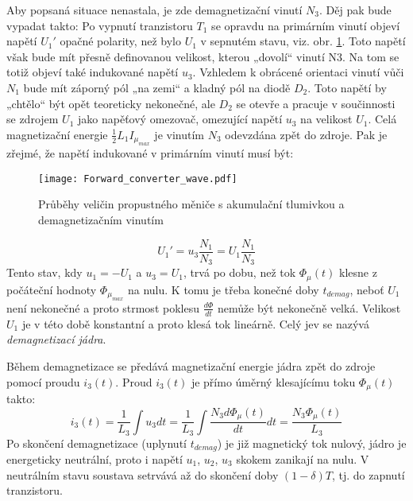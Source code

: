       Aby popsaná situace nenastala, je zde demagnetizační vinutí $N_3$. Děj pak bude vypadat takto: 
      Po vypnutí tranzistoru $T_1$ se opravdu na primárním vinutí objeví napětí $U_1'$ opačné 
      polarity, než bylo $U_1$ v sepnutém stavu, viz. obr. \ref{enz:fig_Forward_demag_wave}. Toto 
      napětí však bude mít přesně definovanou velikost, kterou „dovolí“ vinutí N3. Na tom se totiž 
      objeví také indukované napětí $u_3$. Vzhledem k obrácené orientaci vinutí vůči $N_1$ bude mít 
      záporný pól „na zemi“ a kladný pól na diodě $D_2$. Toto napětí by „chtělo“ být opět teoreticky 
      nekonečné, ale $D_2$ se otevře a pracuje v součinnosti se zdrojem  $U_1$ jako napěťový 
      omezovač, omezující napětí $u_3$ na velikost $U_1$. Celá magnetizační energie 
      $\frac{1}{2}L_1I_{\mu_{max}}$ je vinutím  $N_3$ odevzdána zpět do zdroje. Pak je zřejmé, že 
      napětí indukované v primárním vinutí musí být:
      
      \begin{figure}
        \captionsetup{type=figure}
        \texttt{[image: Forward\_converter\_wave.pdf]}
        \caption{Průběhy veličin propustného měniče s akumulační tlumivkou a demagnetizačním vinutím}
        \label{enz:fig_Forward_demag_wave} 
      \end{figure}                          
      
      \begin{equation}\label{ENZ:eq_forward_u1_demag}
       U_1'=u_3\frac{N_1}{N_3} = U_1\frac{N_1}{N_3}
      \end{equation}
      Tento stav, kdy  $u_1 = -U_1$ a  $u_3 = U_1$, trvá po dobu, než tok $\Phi_\mu(t)$ klesne z 
      počáteční hodnoty $\Phi_{\mu_{max}}$ na nulu. K tomu je třeba konečné doby $t_{demag}$, neboť 
      $U_1$ není nekonečné a proto strmost poklesu $\frac{d\Phi}{dt}$ nemůže být nekonečně velká. 
      Velikost $U_1$ je v této době konstantní a proto klesá tok lineárně. Celý jev se nazývá 
      \emph{demagnetizací jádra}.
      
      Během demagnetizace se předává magnetizační energie jádra zpět do zdroje pomocí proudu 
      $i_3(t)$. Proud $i_3(t)$ je přímo úměrný klesajícímu toku $\Phi_\mu(t)$ takto:
      \begin{equation}\label{ENZ:eq_imag_phi_forward}
       i_3(t) = \frac{1}{L_3}\int{u_3}dt = \frac{1}{L_3}\int{\frac{N_3d\Phi_\mu(t)}{dt}}dt =
       \frac{N_3\Phi_\mu(t)}{L_3}
      \end{equation}
      Po skončení demagnetizace (uplynutí $t_{demag}$) je již magnetický tok nulový, jádro je 
      energeticky neutrální, proto i napětí $u_1$, $u_2$, $u_3$ skokem zanikají na nulu. V 
      neutrálním stavu soustava setrvává až do skončení doby $(1-\delta)T$, tj. do zapnutí 
      tranzistoru.
      

